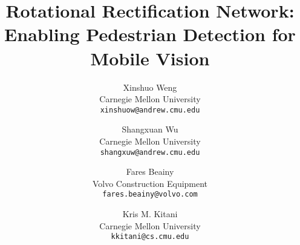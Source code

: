 \documentclass[10pt,twocolumn,letterpaper]{article}
\begin{document}
\title{Rotational Rectification Network: \\Enabling Pedestrian Detection for Mobile Vision}
%

%

\author{Xinshuo Weng\\
Carnegie Mellon University\\
{\tt\small xinshuow@andrew.cmu.edu}
\and
Shangxuan Wu\\
Carnegie Mellon University\\
{\tt\small shangxuw@andrew.cmu.edu}
\and
Fares Beainy\\
Volvo Construction Equipment \\
{\tt\small fares.beainy@volvo.com}
\and
Kris M. Kitani\\
Carnegie Mellon University\\
{\tt\small kkitani@cs.cmu.edu}
}

%
%
\end{document}
